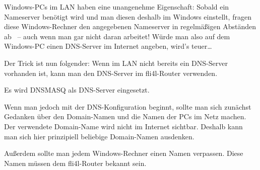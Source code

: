 
  Windows-PCs im LAN haben eine unangenehme
  Eigenschaft: Sobald ein Nameserver benötigt wird und man diesen
  deshalb im Windows einstellt, fragen diese Windows-Rechner den
  angegebenen Nameserver in regelmäßigen Abständen ab
  ~-- auch wenn man gar nicht daran arbeitet!
  Würde man also auf dem Windows-PC einen DNS-Server im Internet angeben,
  wird's teuer\ldots

  Der Trick ist nun folgender: Wenn im LAN nicht bereits ein
  DNS-Server vorhanden ist, kann man den DNS-Server im fli4l-Router
  verwenden.

  Es wird DNSMASQ als DNS-Server eingesetzt.

  Wenn man jedoch mit der DNS-Konfiguration beginnt, sollte man sich
  zunächst Gedanken über den Domain-Namen und die Namen der PCs im
  Netz machen. Der verwendete Domain-Name wird nicht im Internet
  sichtbar. Deshalb kann man sich hier prinzipiell beliebige
  Domain-Namen ausdenken.

  Außerdem sollte man jedem Windows-Rechner einen Namen verpassen.
  Diese Namen müssen dem fli4l-Router bekannt sein.

